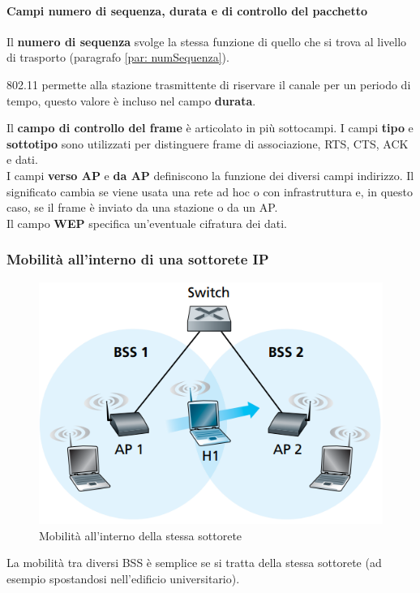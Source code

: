 \documentclass[11pt,a4paper]{article}
\begin{document}
\paragraph{Campi numero di sequenza, durata e di controllo del pacchetto}
Il \textbf{numero di sequenza} svolge la stessa funzione di quello che si trova al livello di trasporto (paragrafo \ref{par: numSequenza}).

802.11 permette alla stazione trasmittente di riservare il canale per un periodo di tempo, questo valore è incluso nel campo \textbf{durata}.

Il \textbf{campo di controllo del frame} è articolato in più sottocampi. I campi \textbf{tipo} e \textbf{sottotipo} sono utilizzati per distinguere frame di associazione, RTS, CTS, ACK e dati. \\
I campi \textbf{verso AP} e \textbf{da AP} definiscono la funzione dei diversi campi indirizzo. Il significato cambia se viene usata una rete ad hoc o con infrastruttura e, in questo caso, se il frame è inviato da una stazione o da un AP. \\
Il campo \textbf{WEP} specifica un'eventuale cifratura dei dati.

\subsubsection{Mobilità all'interno di una sottorete IP}
\begin{figure}
		\includegraphics[scale=0.6]{img/103.png}
		\caption{Mobilità all'interno della stessa sottorete}
		\label{fig: 103}
\end{figure}
La mobilità tra diversi BSS è semplice se si tratta della stessa sottorete (ad esempio spostandosi nell'edificio universitario).
\end{document}

